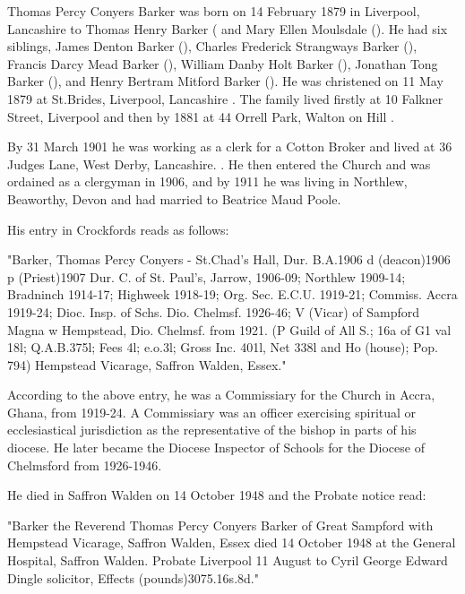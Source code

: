 
 Thomas Percy Conyers Barker was born on 14 February 1879 in Liverpool, Lancashire to Thomas Henry Barker ( and Mary Ellen Moulsdale ().  He had six siblings, James Denton Barker (), Charles Frederick Strangways Barker (),  Francis Darcy Mead Barker (), William Danby Holt Barker (),
Jonathan Tong Barker (), and Henry Bertram Mitford Barker ().
He was christened on 11 May 1879 at St.Brides, Liverpool, Lancashire  \cite{TPCBarkerBirth}. The family lived firstly at 10 Falkner Street, Liverpool  and then by 1881 at 44 Orrell Park, Walton on Hill \cite{TPCBarkerResidence}.

By 31 March 1901 he was working as a clerk for a Cotton Broker and lived at 36 Judges Lane, West Derby, Lancashire. \cite{TPCBarker1901}.  He then entered the Church and was ordained as a clergyman in 1906, and by 1911 he  was living in Northlew, Beaworthy, Devon  \cite{TPCBarker1911} and had married to Beatrice Maud Poole.

His entry in Crockfords reads as follows:

"Barker, Thomas Percy Conyers - St.Chad's Hall, Dur. B.A.1906 d (deacon)1906 p (Priest)1907 Dur. C. of St. Paul's, Jarrow, 1906-09; Northlew 1909-14; Bradninch 1914-17; Highweek 1918-19; Org. Sec. E.C.U. 1919-21; Commiss. Accra 1919-24; Dioc. Insp. of Schs. Dio. Chelmsf. 1926-46; V (Vicar) of Sampford Magna w Hempstead, Dio. Chelmsf. from 1921. (P Guild of All S.; 16a of G1 val 18l; Q.A.B.375l; Fees 4l; e.o.3l; Gross Inc. 401l, Net 338l and Ho (house); Pop. 794) Hempstead Vicarage, Saffron Walden, Essex." \cite{TPCBarkerCrockfords}

According to the above entry, he was a Commissiary for the Church in Accra, Ghana, from 1919-24.  A Commissiary was an officer exercising spiritual or ecclesiastical jurisdiction as the representative of the bishop in parts of his diocese.  He later became the Diocese Inspector of Schools for the Diocese of Chelmsford from 1926-1946.  

He died in Saffron Walden on 14 October 1948 \cite{TPCBarkerDeath} and the Probate notice read:

"Barker the Reverend Thomas Percy Conyers Barker of Great Sampford with Hempstead Vicarage, Saffron Walden, Essex died 14 October 1948 at the General Hospital, Saffron Walden. Probate Liverpool 11 August to Cyril George Edward Dingle solicitor, Effects (pounds)3075.16s.8d." 

